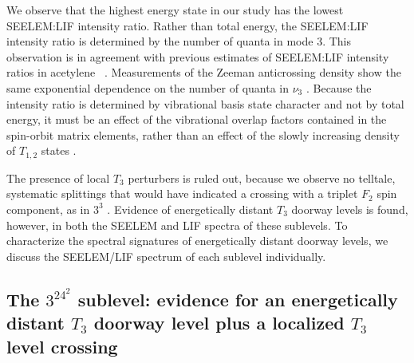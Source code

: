 \documentclass[12pt]{mitthesis}
\begin{document}
We observe that the highest energy state in our study has the lowest
SEELEM:LIF intensity ratio.  Rather than total energy, the SEELEM:LIF
intensity ratio is determined by the number of quanta in mode 3.  This
observation is in agreement with previous estimates of SEELEM:LIF
intensity ratios in acetylene \astate\ \cite{humphrey97}.
Measurements of the Zeeman anticrossing density show the same
exponential dependence on the number of quanta in $\nu_3$
\cite{dupre91}.  Because the intensity ratio is determined by
vibrational basis state character and not by total energy, it must be
an effect of the vibrational overlap factors contained in the
spin-orbit matrix elements, rather than an effect of the slowly
increasing density of $T_{1,2}$ states \cite{dupre91, dupre95b}.

The presence of local $T_3$ perturbers is ruled out, because we
observe no telltale, systematic splittings that would have indicated a
crossing with a triplet $F_2$ spin component, as in $3^3$ 
\cite{mishra04}.  Evidence of energetically distant $T_3$ doorway
levels is found, however, in both the SEELEM and LIF spectra of these
sublevels.  To characterize the spectral signatures of energetically
distant doorway levels, we discuss the SEELEM/LIF spectrum of each
sublevel individually.


\subsection{The $3^24^2$  sublevel: evidence for an
  energetically distant $T_3$ doorway level plus a localized $T_3$
  level crossing}


\end{document}
